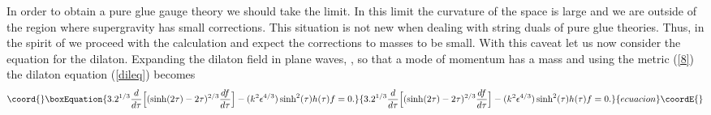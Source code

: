 \documentclass[12pt,epsf,a4paper]{article}
\begin{document}
In order to obtain a pure glue gauge theory we should take the 
\coordHE{} limit. In this limit the curvature of the space is
 large and  we are outside of the region where supergravity has small corrections. 
This situation is not new when dealing with string duals of pure glue theories. Thus, 
in the spirit of \cite{gb1,gb2} we proceed with the calculation and expect the 
corrections to  masses to be small. With this caveat let us now consider the 
equation for the dilaton. Expanding the dilaton field in plane waves, 
\coordHE{}, so that 
a mode of momentum \coordHE{} has a mass  \coordHE{} and using the metric (\ref{8})
the dilaton equation (\ref{dileq}) becomes   
\begin{equation}\coord{}\boxEquation{
3.2^{1/3} \frac {d}{d \tau} \Big[ (\sinh (2 \tau) - 2 \tau)^{2/3} 
\frac {df}{d \tau} \Big] - (k^2 \epsilon^{4/3}) \sinh^2 (\tau) h(\tau) f = 0.
\label{b}
}{
3.2^{1/3} \frac {d}{d \tau} \Big[ (\sinh (2 \tau) - 2 \tau)^{2/3} 
\frac {df}{d \tau} \Big] - (k^2 \epsilon^{4/3}) \sinh^2 (\tau) h(\tau) f = 0.
}{ecuacion}\coordE{}\end{equation}
    
\end{document}
